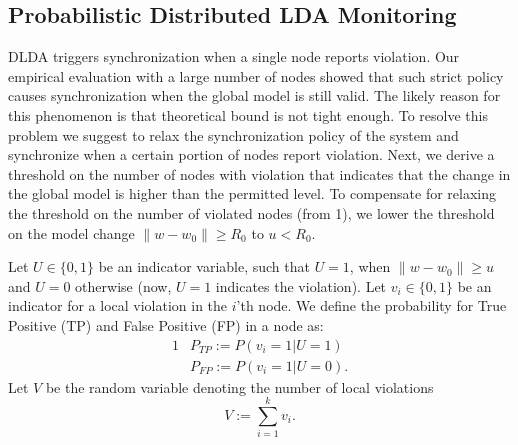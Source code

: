 \documentclass{sig-alternate-05-2015}
\begin{document}
\subsection{Probabilistic Distributed LDA Monitoring}\label{sec:PDLDA}

DLDA triggers synchronization when a single node reports violation.
Our empirical evaluation with a large number of nodes showed that such strict
policy causes synchronization when the global model is still valid. The likely
reason for this phenomenon is that theoretical bound is not tight enough. To resolve this problem
we suggest to relax the synchronization policy of the system and synchronize when a certain
portion of nodes report violation. Next, we derive a threshold on the number of nodes with violation that indicates that the change in the global model is higher than the permitted level. To compensate for relaxing the threshold on the number of violated nodes
(from 1), we lower the threshold on the model change $\|w-w_0\| \geq R_0$  to $u<R_0$.

Let $U\in\{0,1\}$ be an indicator variable, such that $U=1$, when $\|w-w_0\| \geq u$ and $U=0$ otherwise (now, $U=1$ indicates the violation).
%
%
Let $v_i \in \{0,1\}$ be an indicator for a local violation in the
$i$'th node. We define the probability for True Positive (TP) and False Positive
(FP) in a node as:
\begin{alignat*}{1}
& P_{TP} := P(v_i=1 | U=1) \\
& P_{FP} := P(v_i=1 | U=0).
\end{alignat*}
Let $V$ be the random variable denoting the number of local violations
\begin{equation*}
V := \sum_{i=1}^k v_i.
\end{equation*}
\end{document}
